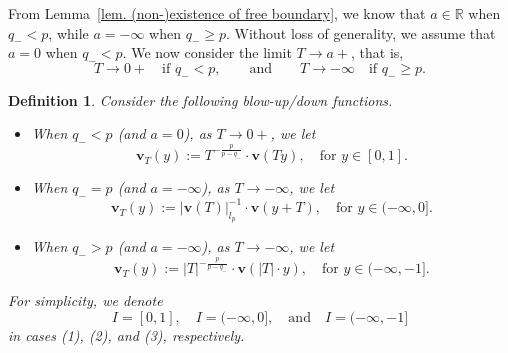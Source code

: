 \documentclass[11pt,twoside,reqno]{amsart}
\newcounter{assu}
\newtheorem{definition}{Definition}[section]
\numberwithin{equation}{section}
\begin{document}
From Lemma~\ref{lem. (non-)existence of free boundary}, we know that $a\in\mathbb{R}$ when $q_{-}<p$, while $a=-\infty$ when $q_{-}\geq p$. Without loss of generality, we assume that $a=0$ when $q_{-}<p$. 
We now consider the limit $T\to a+$, that is,
\[
T\to 0 +\quad\text{if }q_{-}<p,
\qquad\text{and}\qquad
T\to-\infty\quad\text{if }q_{-}\geq p.
\]



\begin{definition}\label{def. blow-up/down process, v_T construction}
Consider the following blow-up/down functions.
\begin{itemize}
    \item[(1)] When $q_{-}<p$ (and $a=0$), as $T\to0+$, we let
    \begin{equation*}
        \mathbf{v}_{T}(y):=T^{-\frac{p}{p-q_{-}}}\cdot\mathbf{v}(Ty),\quad\mbox{for }y\in[0,1].
    \end{equation*}
    \item[(2)] When $q_{-}=p$ (and $a=-\infty$), as $T\to-\infty$, we let
    \begin{equation*}
        \mathbf{v}_{T}(y):=|\mathbf{v}(T)|_{l_{p}}^{-1}\cdot\mathbf{v}(y+T),\quad\mbox{for }y\in(-\infty,0].
    \end{equation*}
    \item[(3)] When $q_{-}>p$ (and $a=-\infty$), as $T\to-\infty$, we let
    \begin{equation*}
        \mathbf{v}_{T}(y):=|T|^{-\frac{p}{p-q_{-}}}\cdot\mathbf{v}(|T|\cdot y),\quad\mbox{for }y\in(-\infty,-1].
    \end{equation*}
\end{itemize}
For simplicity, we denote
\[
I=[0,1],\quad I=(-\infty,0],\quad\text{and}\quad I=(-\infty,-1]
\]
in cases (1), (2), and (3), respectively.
\end{definition}
\end{document}
